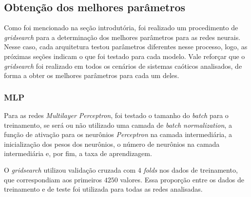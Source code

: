 \documentclass{article}
\begin{document}
\subsection{Obtenção dos melhores parâmetros}


Como foi mencionado na seção introdutória, foi realizado um procedimento de \textit{gridsearch} para a determinação dos melhores parâmetros para as redes neurais. Nesse caso, cada arquitetura testou parâmetros diferentes nesse processo, logo, as próximas seções indicam o que foi testado para cada modelo. Vale reforçar que o \textit{gridsearch} foi realizado em todos os cenários de sistemas caóticos analisados, de forma a obter os melhores parâmetros para cada um deles.

\subsubsection{MLP}

Para as redes \textit{Multilayer Perceptron}, foi testado o tamanho do \textit{batch} para o treinamento, se será ou não utilizado uma camada de \textit{batch normalization}, a função de ativação para os neurônios \textit{Perceptron} na camada intermediária, a inicialização dos pesos dos neurônios, o número de neurônios na camada intermediária e, por fim, a taxa de aprendizagem. 

O \textit{gridsearch} utilizou validação cruzada com $4$ \textit{folds} nos dados de treinamento, que correspondiam aos primeiros $4250$ valores. Essa proporção entre os dados de treinamento e de teste foi utilizada para todas as redes analisadas.
\end{document}
